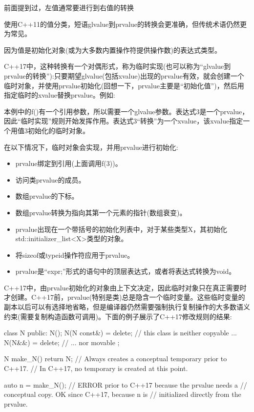 前面提到过，左值通常要进行到右值的转换

\begin{notice}使用C++11的值分类，短语glvalue到prvalue的转换会更准确，但传统术语仍然更为常见。
\end{notice}

因为值是初始化对象(或为大多数内置操作符提供操作数)的表达式类型。

C++17中，这种转换有一个对偶形式，称为临时实现(也可以称为“glvalue到prvalue的转换”):只要期望glvalue(包括xvalue)出现的prvalue有效，就会创建一个临时对象，并使用prvalue初始化(回想一下，prvalue主要是“初始化值”)，然后用指定临时的xvalue替换prvalue。例如:

本例中的f()有一个引用参数，所以需要一个glvalue参数。表达式3是一个prvalue，因此“临时实现”规则开始发挥作用。表达式3“转换”为一个xvalue，该xvalue指定一个用值3初始化的临时对象。

在以下情况下，临时对象会实现，并用prvalue进行初始化:

\begin{itemize}
\item 
prvalue绑定到引用(上面调用f(3))。

\item 
访问类prvalue的成员。

\item 
数组prvalue的下标。

\item 
数组prvalue转换为指向其第一个元素的指针(数组衰变)。

\item 
prvalue出现在一个带括号的初始化列表中，对于某些类型X，其初始化std::initializer\_list<X>类型的对象。

\item 
将sizeof或typeid操作符应用于prvalue。

\item 
prvalue是“expr;”形式的语句中的顶层表达式，或者将表达式转换为void。
\end{itemize}

C++17中，由prvalue初始化的对象由上下文决定，因此临时对象只在真正需要时才创建。C++17前，prvalue(特别是类)总是隐含一个临时变量。这些临时变量的副本以后可以有选择地省略，但是编译器仍然需要强制执行复制操作的大多数语义约束(需要复制构造函数可调用)。下面的例子展示了C++17修改规则的结果:

\begin{cpp}
class N {
	public:
	N();
	N(N const&) = delete; // this class is neither copyable ...
	N(N&&) = delete; // ... nor movable
};

N make_N() {
	return N{}; // Always creates a conceptual temporary prior to C++17.
} 				// In C++17, no temporary is created at this point.

auto n = make_N(); // ERROR prior to C++17 because the prvalue needs a
				// conceptual copy. OK since C++17, because n is
				// initialized directly from the prvalue.
\end{cpp}

